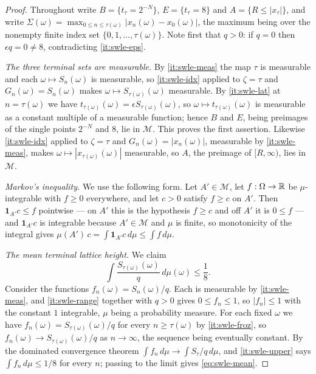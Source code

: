 \begin{proof}
Throughout write
$B=\{t_\tau=2^{-N}\}$, $E=\{t_\tau=8\}$ and $A=\{R\le|x_\tau|\}$, and write
$\Sigma(\omega)=\max_{0\le n\le\tau(\omega)}|x_n(\omega)-x_0(\omega)|$, the
maximum being over the nonempty finite index set $\{0,1,\ldots,\tau(\omega)\}$.
Note first that $q>0$: if $q=0$ then $\epsilon q=0\ne8$, contradicting
\ref{it:swle-eps}.

\emph{The three terminal sets are measurable.} By \ref{it:swle-meas} the map
$\tau$ is measurable and each $\omega\mapsto S_n(\omega)$ is measurable, so
\ref{it:swle-idx} applied to $\zeta=\tau$ and
$G_n(\omega)=S_n(\omega)$ makes $\omega\mapsto S_{\tau(\omega)}(\omega)$
measurable. By \ref{it:swle-lat} at $n=\tau(\omega)$ we have
$t_{\tau(\omega)}(\omega)=\epsilon S_{\tau(\omega)}(\omega)$, so
$\omega\mapsto t_{\tau(\omega)}(\omega)$ is measurable as a constant multiple
of a measurable function; hence $B$ and $E$, being preimages of the single
points $2^{-N}$ and $8$, lie in $\mathcal M$. This proves the first assertion.
Likewise \ref{it:swle-idx} applied to $\zeta=\tau$ and
$G_n(\omega)=|x_n(\omega)|$, measurable by \ref{it:swle-meas}, makes
$\omega\mapsto|x_{\tau(\omega)}(\omega)|$ measurable, so $A$, the preimage of
$[R,\infty)$, lies in $\mathcal M$.

\emph{Markov's inequality.} We use the following form. Let $A'\in\mathcal M$,
let $f:\Omega\to\mathbb{R}$ be $\mu$-integrable with $f\ge0$ everywhere, and let $c>0$
satisfy $f\ge c$ on $A'$. Then $\mathbf1_{A'}c\le f$ pointwise --- on $A'$ this
is the hypothesis $f\ge c$ and off $A'$ it is $0\le f$ --- and
$\mathbf1_{A'}c$ is integrable because $A'\in\mathcal M$ and $\mu$ is finite,
so monotonicity of the integral gives
$\mu(A')\,c=\int\mathbf1_{A'}c\,d\mu\le\int f\,d\mu$.

\emph{The mean terminal lattice height.} We claim
\begin{equation}\label{eq:swle-mean}
  \int\frac{S_{\tau(\omega)}(\omega)}{q}\,d\mu(\omega)\le\frac18 .
\end{equation}
Consider the functions $f_n(\omega)=S_n(\omega)/q$. Each is measurable by
\ref{it:swle-meas}, and \ref{it:swle-range} together with $q>0$ gives
$0\le f_n\le1$, so $|f_n|\le1$ with the constant $1$ integrable, $\mu$ being a
probability measure. For each fixed $\omega$ we have $f_n(\omega)
=S_{\tau(\omega)}(\omega)/q$ for every $n\ge\tau(\omega)$ by
\ref{it:swle-froz}, so $f_n(\omega)\to S_{\tau(\omega)}(\omega)/q$ as
$n\to\infty$, the sequence being eventually constant. By the dominated
convergence theorem $\int f_n\,d\mu\to\int S_\tau/q\,d\mu$, and
\ref{it:swle-upper} says $\int f_n\,d\mu\le1/8$ for every $n$; passing to the
limit gives \eqref{eq:swle-mean}.


\end{proof}
